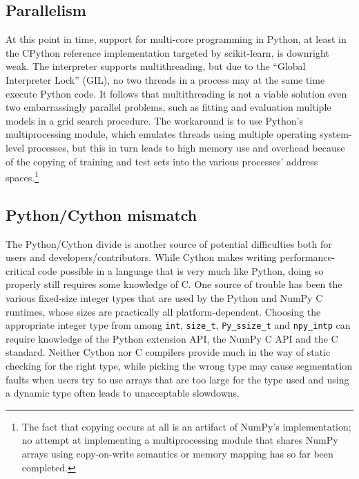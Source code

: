 \documentclass[a4paper]{article}
\begin{document}
\subsection{Parallelism}

At this point in time, support for multi-core programming in Python,
at least in the CPython reference implementation targeted by scikit-learn,
is downright weak.
The interpreter supports multithreading, but due to the ``Global Interpreter Lock'' (GIL),
no two threads in a process may at the same time execute Python code.
It follows that multithreading is not a viable solution
even two embarrassingly parallel problems,
such as fitting and evaluation multiple models in a grid search procedure.
The workaround is to use Python's multiprocessing module,
which emulates threads using multiple operating system-level processes,
but this in turn leads to high memory use and overhead
because of the copying of training and test sets
into the various processes' address spaces.\footnote{
  The fact that copying occurs at all is an artifact of NumPy's implementation;
  no attempt at implementing a multiprocessing module
  that shares NumPy arrays using copy-on-write semantics or memory mapping
  has so far been completed.}

\subsection{Python/Cython mismatch}

The Python/Cython divide is another source of potential difficulties
both for users and developers/contributors.
While Cython makes writing performance-critical code possible
in a language that is very much like Python,
doing so properly still requires some knowledge of C.
One source of trouble has been the various fixed-size integer types
that are used by the Python and NumPy C runtimes,
whose sizes are practically all platform-dependent.
Choosing the appropriate integer type from among
\texttt{int}, \texttt{size\_t}, \texttt{Py\_ssize\_t} and \texttt{npy\_intp}
can require knowledge of the Python extension API,
the NumPy C API and the C standard.
Neither Cython nor C compilers provide much in the way of static checking
for the right type,
while picking the wrong type may cause segmentation faults
when users try to use arrays that are too large for the type used
and using a dynamic type often leads to unacceptable slowdowns.
\end{document}
